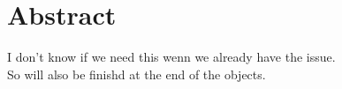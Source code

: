 \chapter{Abstract}
\label{ch:abstract}
I don't know if we need this wenn we already have the issue.\\
So will also be finishd at the end of the objects.